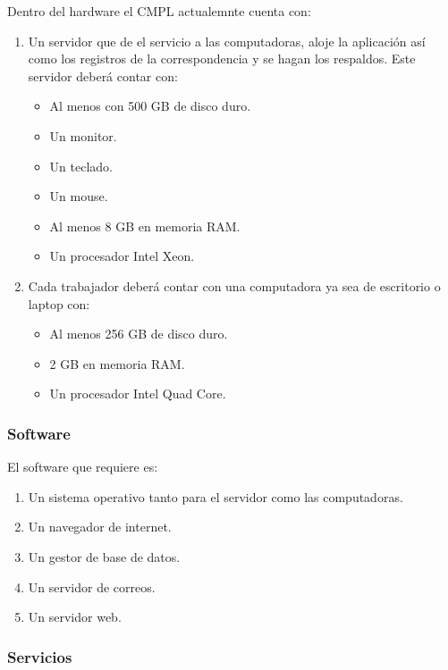 Dentro del hardware el CMPL actualemnte cuenta con:
\begin{enumerate}
	\item Un servidor que de el servicio a las computadoras, aloje la aplicación así como los registros de la correspondencia y se hagan los respaldos. Este servidor deberá contar con: 
	\begin{itemize}
		\item Al menos con 500 GB de disco duro.
		\item Un monitor.
		\item Un teclado.
		\item Un mouse.
		\item Al menos 8 GB en memoria RAM.
		\item Un procesador Intel Xeon.
	\end{itemize}
	\item Cada trabajador deberá contar con una computadora ya sea de escritorio o laptop con: 
	\begin{itemize}
		\item Al menos 256 GB de disco duro.
		\item 2 GB en memoria RAM.
		\item Un procesador Intel Quad Core. 
	\end{itemize}
\end{enumerate}

\subsubsection{Software}
El software que requiere es: 
\begin{enumerate}
	\item Un sistema operativo tanto para el servidor como las computadoras.
	\item Un navegador de internet.
	\item Un gestor de base de datos.
	\item Un servidor de correos.
	\item Un servidor web.
\end{enumerate}

\subsubsection{Servicios}

